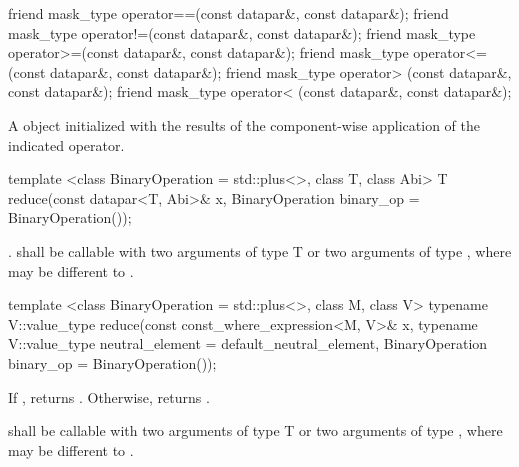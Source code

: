 \begin{itemdecl}
friend mask_type operator==(const datapar&, const datapar&);
friend mask_type operator!=(const datapar&, const datapar&);
friend mask_type operator>=(const datapar&, const datapar&);
friend mask_type operator<=(const datapar&, const datapar&);
friend mask_type operator> (const datapar&, const datapar&);
friend mask_type operator< (const datapar&, const datapar&);
\end{itemdecl}
\begin{itemdescr}
  \pnum\returns A \mask object initialized with the results of the component-wise application of the indicated operator.
\end{itemdescr}

\begin{itemdecl}
template <class BinaryOperation = std::plus<>, class T, class Abi>
T reduce(const datapar<T, Abi>& x, BinaryOperation binary_op = BinaryOperation());
\end{itemdecl}
\begin{itemdescr}
  \pnum\returns {} \foralli.
  \pnum\requires {} shall be callable with two arguments of type \type T or two arguments of type \datapar[<T, A1>], where  may be different to .
  \pnum{}
\end{itemdescr}

\begin{itemdecl}
template <class BinaryOperation = std::plus<>, class M, class V>
typename V::value_type reduce(const const_where_expression<M, V>& x,
                              typename V::value_type neutral_element = default_neutral_element,
                              BinaryOperation binary_op = BinaryOperation());
\end{itemdecl}
\begin{itemdescr}
  \pnum\returns
  If , returns .
  Otherwise, returns  .

  \pnum\requires {} shall be callable with two arguments of type \type T or two arguments of type \datapar[<T, A1>], where  may be different to .
  \pnum{}
\end{itemdescr}

